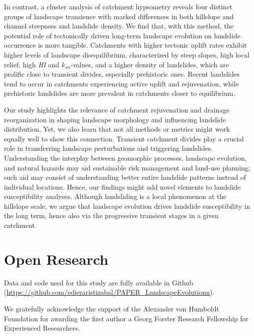 \documentclass[draft]{agujournal2019}
\begin{document}
\par In contrast, a cluster analysis of catchment hypsometry reveals four distinct groups of landscape transience with marked differences in both hillslope and channel steepness and landslide density. We find that, with this method, the potential role of tectonically driven long-term landscape evolution on landslide occurrence is more tangible. Catchments with higher tectonic uplift rates exhibit higher levels of landscape disequilibrium, characterized by steep slopes, high local relief, high \textit{HI} and $k_{sn}$-values, and a higher density of landslides, which are prolific close to transient divides, especially prehistoric ones. Recent landslides tend to occur in catchments experiencing active uplift and rejuvenation, while prehistoric landslides are more prevalent in catchments closer to equilibrium.  

\par Our study highlights the relevance of catchment rejuvenation and drainage reorganization in shaping landscape morphology and influencing landslide distribution. Yet, we also learn that not all methods or metrics might work equally well to show this connection. Transient catchment divides play a crucial role in transferring landscape perturbations and triggering landslides. Understanding the interplay between geomorphic processes, landscape evolution, and natural hazards may aid sustainable risk management and land-use planning; such aid may consist of understanding better entire landslide patterns instead of individual locations. Hence, our findings might add novel elements to landslide susceptibility analyses. Although landsliding is a local phenomenon at the hillslope scale, we argue that landscape evolution drives landslide susceptibility in the long term, hence also via the progressive transient stages in a given catchment.


\section{Open Research}
Data and code used for this study are fully available in Github (\url{https://github.com/edieraristizabal/PAPER_LandscapeEvolutionn}).

\acknowledgments
We gratefully acknowledge the support of the Alexander von Humboldt Foundation for awarding the first author a Georg Forster Research Fellowship for Experienced Researchers.


\end{document}
